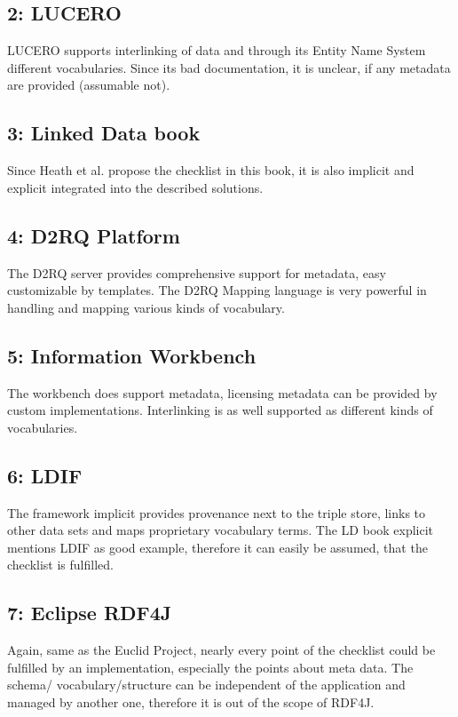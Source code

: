 \subsection*{2: LUCERO}
LUCERO supports interlinking of data and through its Entity Name System different 
vocabularies. Since its bad documentation, it is unclear, if any metadata are 
provided (assumable not).

\subsection*{3: Linked Data book}
Since Heath et al. propose the checklist in this book, it is also implicit and 
explicit integrated into the described solutions.

\subsection*{4: D2RQ Platform}
The D2RQ server provides comprehensive support for metadata, easy customizable by 
templates. The D2RQ Mapping language is very powerful in handling and mapping 
various kinds of vocabulary.

\subsection*{5: Information Workbench}
The workbench does support metadata, licensing metadata can be provided by custom 
implementations. Interlinking is as well supported as different kinds of 
vocabularies.

\subsection*{6: LDIF}
The framework implicit provides provenance next to the triple store, links to 
other data sets and maps proprietary vocabulary terms. The LD book explicit 
mentions LDIF as good example, therefore it can easily be assumed, that the 
checklist is fulfilled.

\subsection*{7: Eclipse RDF4J}
Again, same as the Euclid Project, nearly every point of the checklist could be 
fulfilled by an implementation, especially the points about meta data. The schema/
vocabulary/structure can be independent of the application and managed by another 
one, therefore it is out of the scope of RDF4J.

